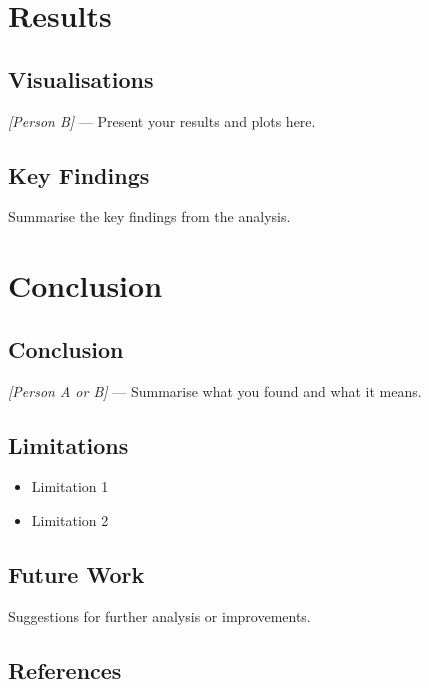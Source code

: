 \documentclass[
  english,
  12pt,
  11pt,
  a4paper,
  openany]{memoir}
\providecommand{\tightlist}{%
  \setlength{\itemsep}{0pt}\setlength{\parskip}{0pt}}
\let\backmatter\relax
\begin{document}
\chapter{Results}\label{results}

\section{Visualisations}\label{visualisations}

\emph{{[}Person B{]}} --- Present your results and plots here.

\section{Key Findings}\label{key-findings}

Summarise the key findings from the analysis.

\chapter{Conclusion}\label{conclusion}

\section{Conclusion}\label{conclusion-1}

\emph{{[}Person A or B{]}} --- Summarise what you found and what it
means.

\section{Limitations}\label{limitations}

\begin{itemize}
\tightlist
\item
  Limitation 1
\item
  Limitation 2
\end{itemize}

\section{Future Work}\label{future-work}

Suggestions for further analysis or improvements.

\section{References}\label{references}

\renewcommand{\bibsection}{}



\backmatter
\end{document}
